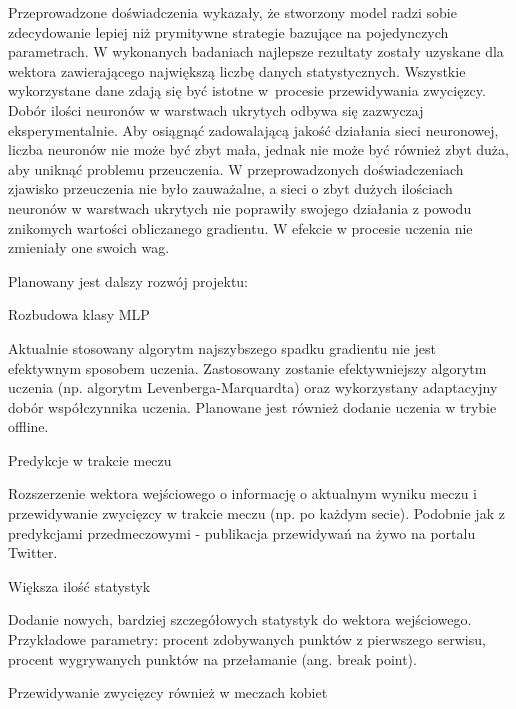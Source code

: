 Przeprowadzone doświadczenia wykazały, że stworzony model radzi sobie zdecydowanie lepiej niż prymitywne strategie bazujące na pojedynczych parametrach. W wykonanych badaniach najlepsze rezultaty zostały uzyskane dla wektora zawierającego największą liczbę danych statystycznych. Wszystkie wykorzystane dane zdają się być istotne w~procesie przewidywania zwycięzcy. Dobór ilości neuronów w warstwach ukrytych odbywa się zazwyczaj eksperymentalnie. Aby osiągnąć zadowalającą jakość działania sieci neuronowej, liczba neuronów nie może być zbyt mała, jednak nie może być również zbyt duża, aby uniknąć problemu przeuczenia. W przeprowadzonych doświadczeniach zjawisko przeuczenia nie było zauważalne, a sieci o zbyt dużych ilościach neuronów w warstwach ukrytych nie poprawiły swojego działania z powodu znikomych wartości obliczanego gradientu. W efekcie w procesie uczenia nie zmieniały one swoich wag.

Planowany jest dalszy rozwój projektu:

\begin{tightitemize}
\item Rozbudowa klasy MLP

Aktualnie stosowany algorytm najszybszego spadku gradientu nie jest efektywnym sposobem uczenia. Zastosowany zostanie efektywniejszy algorytm uczenia (np. algorytm Levenberga-Marquardta) oraz wykorzystany adaptacyjny dobór współczynnika uczenia. Planowane jest również dodanie uczenia w trybie offline.

\item Predykcje w trakcie meczu

Rozszerzenie wektora wejściowego o informację o aktualnym wyniku meczu i przewidywanie zwycięzcy w trakcie meczu (np. po każdym secie). Podobnie jak z predykcjami przedmeczowymi - publikacja przewidywań na żywo na portalu Twitter.

\item Większa ilość statystyk

Dodanie nowych, bardziej szczegółowych statystyk do wektora wejściowego. Przykładowe parametry: procent zdobywanych punktów z pierwszego serwisu, procent wygrywanych punktów na przełamanie (ang. break point).

\item Przewidywanie zwycięzcy również w meczach kobiet

\end{tightitemize}




\listoffigures
\listoftables

